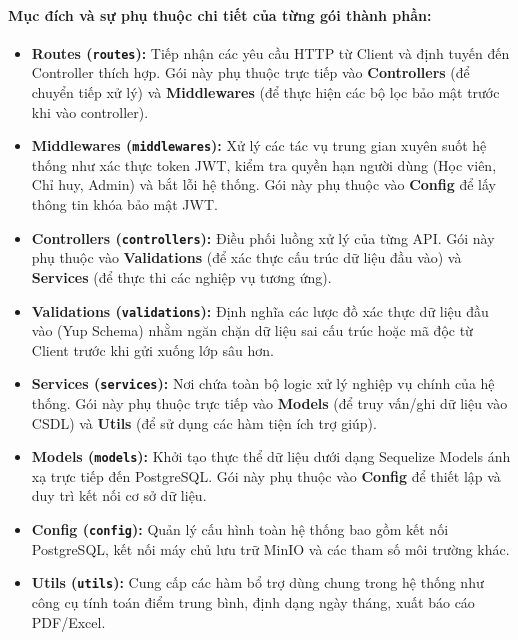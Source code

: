 \documentclass[../DoAn.tex]{subfiles}
\begin{document}
\paragraph{Mục đích và sự phụ thuộc chi tiết của từng gói thành phần:}
\begin{itemize}
    \item \textbf{Routes (\texttt{routes}):} Tiếp nhận các yêu cầu HTTP từ Client và định tuyến đến Controller thích hợp. Gói này phụ thuộc trực tiếp vào \textbf{Controllers} (để chuyển tiếp xử lý) và \textbf{Middlewares} (để thực hiện các bộ lọc bảo mật trước khi vào controller).
    
    \item \textbf{Middlewares (\texttt{middlewares}):} Xử lý các tác vụ trung gian xuyên suốt hệ thống như xác thực token JWT, kiểm tra quyền hạn người dùng (Học viên, Chỉ huy, Admin) và bắt lỗi hệ thống. Gói này phụ thuộc vào \textbf{Config} để lấy thông tin khóa bảo mật JWT.
    
    \item \textbf{Controllers (\texttt{controllers}):} Điều phối luồng xử lý của từng API. Gói này phụ thuộc vào \textbf{Validations} (để xác thực cấu trúc dữ liệu đầu vào) và \textbf{Services} (để thực thi các nghiệp vụ tương ứng).
    
    \item \textbf{Validations (\texttt{validations}):} Định nghĩa các lược đồ xác thực dữ liệu đầu vào (Yup Schema) nhằm ngăn chặn dữ liệu sai cấu trúc hoặc mã độc từ Client trước khi gửi xuống lớp sâu hơn.
    
    \item \textbf{Services (\texttt{services}):} Nơi chứa toàn bộ logic xử lý nghiệp vụ chính của hệ thống. Gói này phụ thuộc trực tiếp vào \textbf{Models} (để truy vấn/ghi dữ liệu vào CSDL) và \textbf{Utils} (để sử dụng các hàm tiện ích trợ giúp).
    
    \item \textbf{Models (\texttt{models}):} Khởi tạo thực thể dữ liệu dưới dạng Sequelize Models ánh xạ trực tiếp đến PostgreSQL. Gói này phụ thuộc vào \textbf{Config} để thiết lập và duy trì kết nối cơ sở dữ liệu.
    
    \item \textbf{Config (\texttt{config}):} Quản lý cấu hình toàn hệ thống bao gồm kết nối PostgreSQL, kết nối máy chủ lưu trữ MinIO và các tham số môi trường khác.
    
    \item \textbf{Utils (\texttt{utils}):} Cung cấp các hàm bổ trợ dùng chung trong hệ thống như công cụ tính toán điểm trung bình, định dạng ngày tháng, xuất báo cáo PDF/Excel.
\end{itemize}
\end{document}
